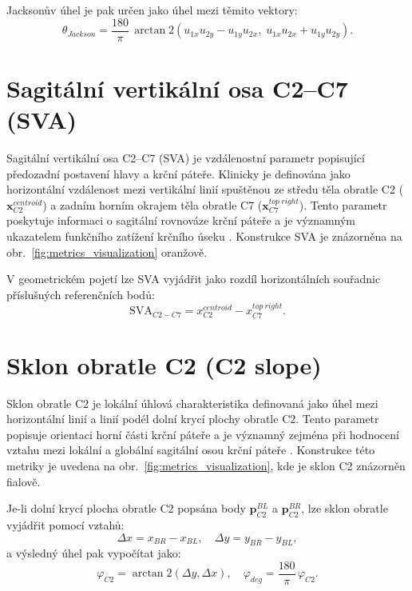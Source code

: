\documentclass[male,czech,api_bc]{kitheses}
\begin{document}
Jacksonův úhel je pak určen jako úhel mezi těmito vektory:
\begin{equation}
\theta_{Jackson} = \frac{180}{\pi}\,\arctan2(u_{1x}u_{2y} - u_{1y}u_{2x}, \; u_{1x}u_{2x} + u_{1y}u_{2y}).
\end{equation}

\section*{Sagitální vertikální osa C2--C7 (SVA)}

Sagitální vertikální osa C2--C7 (SVA) je vzdálenostní parametr popisující předozadní postavení hlavy a krční páteře. Klinicky je definována jako horizontální vzdálenost mezi vertikální linií spuštěnou ze středu těla obratle C2 ($\mathbf{x}_{C2}^{centroid}$) a zadním horním okrajem těla obratle C7 ($\mathbf{x}_{C7}^{top\ right}$). Tento parametr poskytuje informaci o sagitální rovnováze krční páteře a je významným ukazatelem funkčního zatížení krčního úseku \cite{Bolcha2025}. Konstrukce SVA je znázorněna na obr.~\ref{fig:metrics_visualization} oranžově.

V geometrickém pojetí lze SVA vyjádřit jako rozdíl horizontálních souřadnic příslušných referenčních bodů:
\begin{equation}\label{eq:sva_c2c7}
\mathrm{SVA}_{C2-C7} = {x}_{C2}^{centroid} - {x}_{C7}^{top\ right}.
\end{equation}

\section*{Sklon obratle C2 (C2 slope)}

Sklon obratle C2 je lokální úhlová charakteristika definovaná jako úhel mezi horizontální linií a linií podél dolní krycí plochy obratle C2. Tento parametr popisuje orientaci horní části krční páteře a je významný zejména při hodnocení vztahu mezi lokální a globální sagitální osou krční páteře \cite{Bolcha2025}. Konstrukce této metriky je uvedena na obr.~\ref{fig:metrics_visualization}, kde je sklon C2 znázorněn fialově.

Je-li dolní krycí plocha obratle C2 popsána body $\mathbf{p}_{C2}^{BL}$ a $\mathbf{p}_{C2}^{BR}$, lze sklon obratle vyjádřit pomocí vztahů:
\begin{equation}\label{eq:c2_slope_delta}
\Delta x = x_{BR} - x_{BL}, \quad \Delta y = y_{BR} - y_{BL},
\end{equation}
a výsledný úhel pak vypočítat jako:
\begin{equation}\label{eq:c2_slope_angle}
\varphi_{C2} = \arctan2(\Delta y, \Delta x), \quad
\varphi_{deg} = \frac{180}{\pi}\,\varphi_{C2}.
\end{equation}
\end{document}
